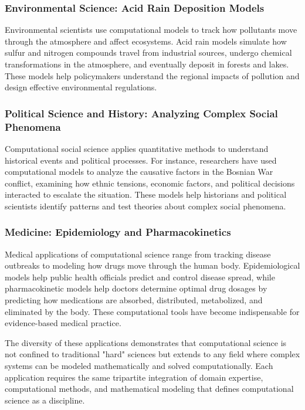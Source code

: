 \subsubsection{Environmental Science: Acid Rain Deposition Models}

Environmental scientists use computational models to track how pollutants move through the atmosphere and affect ecosystems. Acid rain models simulate how sulfur and nitrogen compounds travel from industrial sources, undergo chemical transformations in the atmosphere, and eventually deposit in forests and lakes. These models help policymakers understand the regional impacts of pollution and design effective environmental regulations.

\subsubsection{Political Science and History: Analyzing Complex Social Phenomena}

Computational social science applies quantitative methods to understand historical events and political processes. For instance, researchers have used computational models to analyze the causative factors in the Bosnian War conflict, examining how ethnic tensions, economic factors, and political decisions interacted to escalate the situation. These models help historians and political scientists identify patterns and test theories about complex social phenomena.

\subsubsection{Medicine: Epidemiology and Pharmacokinetics}

Medical applications of computational science range from tracking disease outbreaks to modeling how drugs move through the human body. Epidemiological models help public health officials predict and control disease spread, while pharmacokinetic models help doctors determine optimal drug dosages by predicting how medications are absorbed, distributed, metabolized, and eliminated by the body. These computational tools have become indispensable for evidence-based medical practice.

The diversity of these applications demonstrates that computational science is not confined to traditional "hard" sciences but extends to any field where complex systems can be modeled mathematically and solved computationally. Each application requires the same tripartite integration of domain expertise, computational methods, and mathematical modeling that defines computational science as a discipline.

